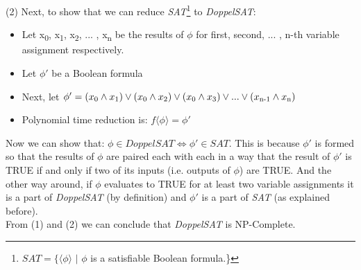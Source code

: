 \documentclass{article}
\begin{document}
(2) Next, to show that we can reduce \textit{SAT}\footnote{\begin{math} SAT = \{ \langle \phi \rangle \end{math} \begin{math}|\end{math} \begin{math}\phi \end{math}
is a satisfiable Boolean formula.\}} to \textit{DoppelSAT}:
\begin{itemize}
\item Let x\textsubscript{0}, x\textsubscript{1}, x\textsubscript{2}, ... , x\textsubscript{n}
be the results of \begin{math} \phi \end{math} for first, second, ... , n-th variable assignment respectively.
\item Let \begin{math} \phi ' \end{math} be a Boolean formula 
\item Next, let \begin{math} \phi ' = (x\textsubscript{0} \land x\textsubscript{1}) \lor (x\textsubscript{0} \land x\textsubscript{2}) \lor 
(x\textsubscript{0} \land x\textsubscript{3}) \lor ... \lor (x\textsubscript{n-1} \land x\textsubscript{n}) \end{math}
\item Polynomial time reduction is:
\begin{math}
f\langle \phi \rangle = \phi '
\end{math}
\end{itemize}
Now we can show that: \begin{math} \phi \in {DoppelSAT} \iff \phi ' \in SAT\end{math}. This is because \begin{math} \phi ' \end{math} is formed so that
the results of \begin{math} \phi \end{math} are paired each with each in a way that the result of \begin{math} \phi ' \end{math} is TRUE if and only if
two of its inputs (i.e. outputs of \begin{math} \phi \end{math}) are TRUE. And the other way around, if \begin{math} \phi \end{math} evaluates to 
TRUE for at least two variable assignments it is a part of \textit{DoppelSAT} (by definition) and \begin{math} \phi '\end{math} is a part of 
\textit{SAT} (as explained before).\\

From (1) and (2) we can conclude that \textit{DoppelSAT} is NP-Complete.
\end{document}
